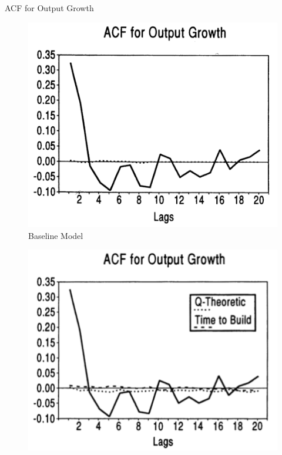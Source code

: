 \documentclass[10pt]{beamer}
\begin{document}
\begin{frame}{ACF for Output Growth}
    \begin{minipage}{0.33\textwidth}
        \begin{figure}
            \centering
            \includegraphics[width=\linewidth]{figures/Bse_ACF.png}
            \caption{Baseline Model}
        \end{figure}
    \end{minipage}%
    \begin{minipage}{0.33\textwidth}
        \begin{figure}
            \centering
            \includegraphics[width=\linewidth]{figures/K_ACF.png}

\end{figure}
\end{minipage}
\end{frame}
\end{document}

